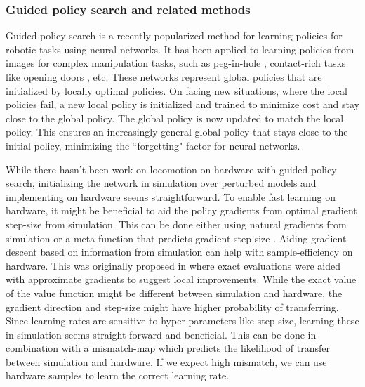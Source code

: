 
\subsubsection{Guided policy search and related methods}

Guided policy search is a recently popularized method for learning policies for robotic tasks \cite{levine2013guided} using neural networks. It has been applied to learning policies from images for complex manipulation tasks, such as peg-in-hole \cite{levine2016end}, contact-rich tasks like opening doors \cite{levine2015learning}, etc. These networks represent global policies that are initialized by locally optimal policies. On facing new situations, where the local policies fail, a new local policy is initialized and trained to minimize cost and stay close to the global policy. The global policy is now updated to match the local policy. This ensures an increasingly general global policy that stays close to the initial policy, minimizing the ``forgetting" factor for neural networks. 

While there hasn't been work on locomotion on hardware with guided policy search, initializing the network in simulation over perturbed models and implementing on hardware seems straightforward. To enable fast learning on hardware, it might be beneficial to aid the policy gradients from optimal gradient step-size from simulation. This can be done either using natural gradients \cite{peters2006policy} from simulation or a meta-function that predicts gradient step-size \cite{meier2017online}. Aiding gradient descent based on information from simulation can help with sample-efficiency on hardware. This was originally proposed in \cite{abbeel2006using} where exact evaluations were aided with approximate gradients to suggest local improvements. While the exact value of the value function might be different between simulation and hardware, the gradient direction and step-size might have higher probability of transferring. Since learning rates are sensitive to hyper parameters like step-size, learning these in simulation seems straight-forward and beneficial. This can be done in combination with a mismatch-map which predicts the likelihood of transfer between simulation and hardware. If we expect high mismatch, we can use hardware samples to learn the correct learning rate.